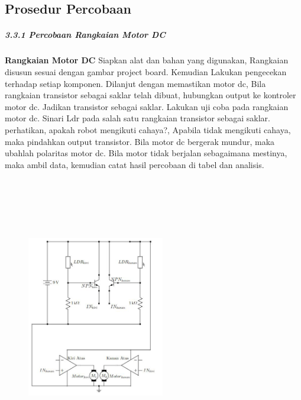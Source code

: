 \documentclass[12pt,a4paper]{article}
\begin{document}
  
    
\subsection{Prosedur Percobaan}
\subparagraph{3.3.1 Percobaan Rangkaian Motor DC }
\subparagraph{ }
\textbf{Rangkaian Motor DC} 
	Siapkan alat dan bahan yang digunakan, Rangkaian disusun sesuai dengan gambar project board. Kemudian Lakukan pengecekan terhadap setiap komponen. Dilanjut dengan memastikan motor dc, Bila rangkaian transistor sebagai saklar telah dibuat, hubungkan output ke kontroler motor dc. Jadikan transistor sebagai saklar. Lakukan uji coba pada rangkaian motor dc. Sinari Ldr pada salah satu rangkaian transistor sebagai saklar. perhatikan, apakah robot mengikuti cahaya?, Apabila tidak mengikuti cahaya, maka pindahkan output transistor. Bila motor dc bergerak mundur, maka ubahlah polaritas motor dc. Bila motor tidak berjalan sebagaimana mestinya, maka ambil data, kemudian catat hasil percobaan di tabel dan analisis.
	
\begin{figure}
\paragraph{ }
\begin{center}
\includegraphics[width=6cm, height=12cm]{g3.png}
\end{center}
\end{figure}
\vspace{2cm}
\end{document}
